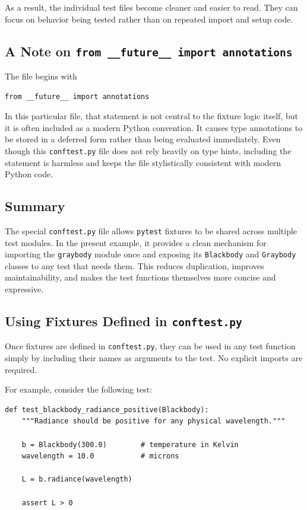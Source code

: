 As a result, the individual test files become cleaner and easier to read. They can focus on behavior being tested rather than on repeated import and setup code.

\subsection{A Note on \texttt{from \_\_future\_\_ import annotations}}

The file begins with

\begin{verbatim}
from __future__ import annotations
\end{verbatim}

In this particular file, that statement is not central to the fixture logic itself, but it is often included as a modern Python convention. It causes type annotations to be stored in a deferred form rather than being evaluated immediately. Even though this \texttt{conftest.py} file does not rely heavily on type hints, including the statement is harmless and keeps the file stylistically consistent with modern Python code.

\subsection{Summary}

The special \texttt{conftest.py} file allows \texttt{pytest} fixtures to be shared across multiple test modules. In the present example, it provides a clean mechanism for importing the \texttt{graybody} module once and exposing its \texttt{Blackbody} and \texttt{Graybody} classes to any test that needs them. This reduces duplication, improves maintainability, and makes the test functions themselves more concise and expressive.

\subsection{Using Fixtures Defined in \texttt{conftest.py}}

Once fixtures are defined in \texttt{conftest.py}, they can be used in any test function simply by including their names as arguments to the test. No explicit imports are required.

For example, consider the following test:

\begin{verbatim}
def test_blackbody_radiance_positive(Blackbody):
    """Radiance should be positive for any physical wavelength."""

    b = Blackbody(300.0)        # temperature in Kelvin
    wavelength = 10.0           # microns

    L = b.radiance(wavelength)

    assert L > 0
\end{verbatim}

